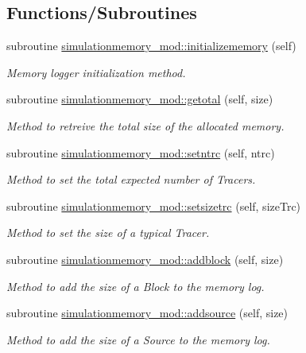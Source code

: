 \subsection*{Functions/\+Subroutines}
\begin{DoxyCompactItemize}
\item 
subroutine \mbox{\hyperlink{namespacesimulationmemory__mod_afaf06c4001ebc289c12a9358a99d224d}{simulationmemory\+\_\+mod\+::initializememory}} (self)
\begin{DoxyCompactList}\small\item\em Memory logger initialization method. \end{DoxyCompactList}\item 
subroutine \mbox{\hyperlink{namespacesimulationmemory__mod_a3eb0ad61a559664ed4227ca4ad1746af}{simulationmemory\+\_\+mod\+::getotal}} (self, size)
\begin{DoxyCompactList}\small\item\em Method to retreive the total size of the allocated memory. \end{DoxyCompactList}\item 
subroutine \mbox{\hyperlink{namespacesimulationmemory__mod_a936043befeeb2a3a79b31b519295b842}{simulationmemory\+\_\+mod\+::setntrc}} (self, ntrc)
\begin{DoxyCompactList}\small\item\em Method to set the total expected number of Tracers. \end{DoxyCompactList}\item 
subroutine \mbox{\hyperlink{namespacesimulationmemory__mod_a48844ee646c6d29108f5bb1bdb9fd1bf}{simulationmemory\+\_\+mod\+::setsizetrc}} (self, size\+Trc)
\begin{DoxyCompactList}\small\item\em Method to set the size of a typical Tracer. \end{DoxyCompactList}\item 
subroutine \mbox{\hyperlink{namespacesimulationmemory__mod_a2ade4b86d68e8daa4f22e1cdf7473e2c}{simulationmemory\+\_\+mod\+::addblock}} (self, size)
\begin{DoxyCompactList}\small\item\em Method to add the size of a Block to the memory log. \end{DoxyCompactList}\item 
subroutine \mbox{\hyperlink{namespacesimulationmemory__mod_ae5682757ed7e3e005a1b54e5b44ed8a1}{simulationmemory\+\_\+mod\+::addsource}} (self, size)
\begin{DoxyCompactList}\small\item\em Method to add the size of a Source to the memory log. \end{DoxyCompactList}\item 

\end{DoxyCompactItemize}
